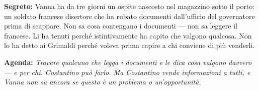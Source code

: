 \clearpage

\begin{secretbox}
  \textbf{Segreto:} Vanna ha da tre giorni un ospite nascosto nel magazzino
  sotto il porto: un soldato francese disertore che ha rubato documenti
  dall'ufficio del governatore prima di scappare. Non sa cosa contengano
  i documenti — non sa leggere il francese. Li ha tenuti perché istintivamente
  ha capito che valgono qualcosa. Non lo ha detto ai Grimaldi perché voleva
  prima capire a chi conviene di più venderli.

  \medskip\noindent\textcolor{SecretRed}{\textbf{Agenda:}}
  \textit{Trovare qualcuno che legga i documenti e le dica cosa valgono
  davvero — e per chi. Costantino può farlo. Ma Costantino vende informazioni
  a tutti, e Vanna non sa ancora se questo è un problema o un'opportunità.}
\end{secretbox}
